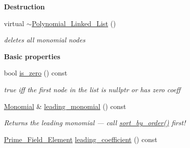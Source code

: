 \begin{Indent}\textbf{ Destruction}\par
\begin{DoxyCompactItemize}
\item 
\mbox{\label{class_polynomial___linked___list_a02235c20d279afa443ea836fd9336cfc}} 
virtual \hyperlink{class_polynomial___linked___list_a02235c20d279afa443ea836fd9336cfc}{$\sim$\+Polynomial\+\_\+\+Linked\+\_\+\+List} ()
\begin{DoxyCompactList}\small\item\em deletes all monomial nodes \end{DoxyCompactList}\end{DoxyCompactItemize}
\end{Indent}
\begin{Indent}\textbf{ Basic properties}\par
\begin{DoxyCompactItemize}
\item 
\mbox{\label{class_polynomial___linked___list_a058ac3c4caa7764fe107c37e5402357f}} 
bool \hyperlink{class_polynomial___linked___list_a058ac3c4caa7764fe107c37e5402357f}{is\+\_\+zero} () const
\begin{DoxyCompactList}\small\item\em true iff the first node in the list is {\ttfamily nullptr} or has zero coeff \end{DoxyCompactList}\item 
\mbox{\label{class_polynomial___linked___list_aee580ed4521a6d4e630468a615e9f076}} 
\hyperlink{class_monomial}{Monomial} \& \hyperlink{class_polynomial___linked___list_aee580ed4521a6d4e630468a615e9f076}{leading\+\_\+monomial} () const
\begin{DoxyCompactList}\small\item\em Returns the leading monomial --- call \hyperlink{class_polynomial___linked___list_a090952238fa270da20b6b78dd43092b8}{sort\+\_\+by\+\_\+order()} first! \end{DoxyCompactList}\item 
\mbox{\label{class_polynomial___linked___list_ac623bb00ddd39ac7176a05a9f0751570}} 
\hyperlink{class_prime___field___element}{Prime\+\_\+\+Field\+\_\+\+Element} \hyperlink{class_polynomial___linked___list_ac623bb00ddd39ac7176a05a9f0751570}{leading\+\_\+coefficient} () const

\end{DoxyCompactItemize}
\end{Indent}
